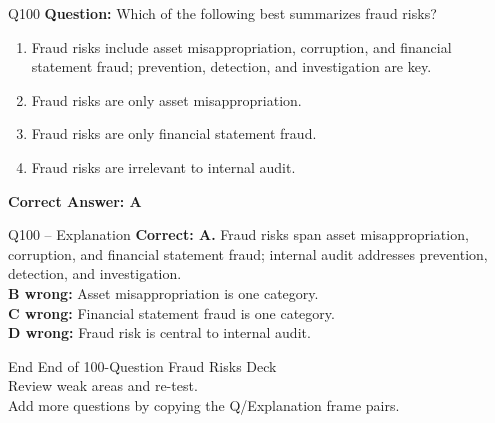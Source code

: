 \documentclass[aspectratio=169,10pt]{beamer}
\begin{document}
	\begin{frame}[t]{Q100}
		\small
		\textbf{Question:} Which of the following best summarizes fraud risks?
		\begin{enumerate}[label=\Alph*.,itemsep=1pt,topsep=2pt]
			\item Fraud risks include asset misappropriation, corruption, and financial statement fraud; prevention, detection, and investigation are key.
			\item Fraud risks are only asset misappropriation.
			\item Fraud risks are only financial statement fraud.
			\item Fraud risks are irrelevant to internal audit.
		\end{enumerate}
		\vspace{4pt}
		\textbf{Correct Answer: A}
	\end{frame}
	
	\begin{frame}[t]{Q100 -- Explanation}
		\small
		\textbf{Correct: A.} Fraud risks span asset misappropriation, corruption, and financial statement fraud; internal audit addresses prevention, detection, and investigation. \\[4pt]
		\textbf{B wrong:} Asset misappropriation is one category. \\[2pt]
		\textbf{C wrong:} Financial statement fraud is one category. \\[2pt]
		\textbf{D wrong:} Fraud risk is central to internal audit.
	\end{frame}
	
	\begin{frame}{End}
		\centering
		\Large End of 100-Question Fraud Risks Deck\\[8pt]
		\normalsize Review weak areas and re-test.\\[4pt]
		\small Add more questions by copying the Q/Explanation frame pairs.
	\end{frame}
	
\end{document}
